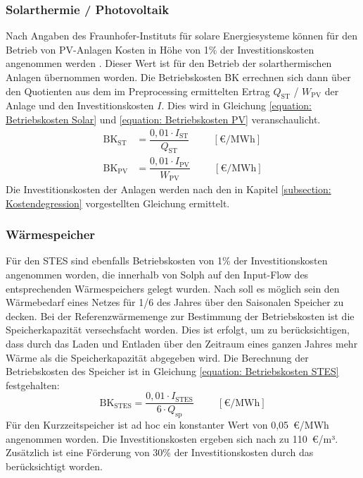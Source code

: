 \subsubsection*{Solarthermie / Photovoltaik}
Nach Angaben des Fraunhofer-Instituts für solare Energiesysteme können für den Betrieb von \ac{PV}-Anlagen Kosten in Höhe von 1\% der Investitionskosten angenommen werden \cite{ISE}. Dieser Wert ist für den Betrieb der solarthermischen Anlagen übernommen worden. Die Betriebskosten BK errechnen sich dann über den Quotienten aus dem im Preprocessing ermittelten Ertrag $Q_\text{ST}$ / $W_\text{PV}$ der Anlage und den Investitionskosten $I$. Dies wird in Gleichung \ref{equation: Betriebskosten Solar} und \ref{equation: Betriebskosten PV} veranschaulicht. 
	\begin{align}
		\label{equation: Betriebskosten Solar}
		\text{BK}_\text{ST} &= \dfrac{0,01 \cdot I_\text{ST}}{Q_\text{ST}} \hspace{1cm} [\euro/\text{MWh}]\\
		\label{equation: Betriebskosten PV}
		\text{BK}_\text{PV} &= \dfrac{0,01 \cdot I_\text{PV}}{W_\text{PV}} \hspace{1cm} [\euro/\text{MWh}]
	\end{align}
Die Investitionskosten der Anlagen werden nach den in Kapitel \ref{subsection: Kostendegression} vorgestellten Gleichung ermittelt.

\subsubsection*{Wärmespeicher}
Für den \ac{STES} sind ebenfalls Betriebskosten von 1\% der Investitionskosten angenommen worden, die innerhalb von Solph auf den Input-Flow des entsprechenden Wärmespeichers gelegt wurden. Nach \citet{Waermenetz40} soll es möglich sein den Wärmebedarf eines Netzes für 1/6 des Jahres über den Saisonalen Speicher zu decken. Bei der Referenzwärmemenge zur Bestimmung der Betriebskosten ist die Speicherkapazität versechsfacht worden. Dies ist erfolgt, um zu berücksichtigen, dass durch das Laden und Entladen über den Zeitraum eines ganzen Jahres mehr Wärme als die Speicherkapazität abgegeben wird. Die Berechnung der Betriebskosten des Speicher ist in Gleichung \ref{equation: Betriebskosten STES} festgehalten:
	\begin{equation}
		\label{equation: Betriebskosten STES}
		\text{BK}_\text{STES} = \dfrac{0,01 \cdot I_\text{STES}}{6 \cdot Q_\text{sp}} \hspace{1cm} [\euro/\text{MWh}]
	\end{equation}
Für den Kurzzeitspeicher ist ad hoc ein konstanter Wert von 0,05~\euro/MWh angenommen worden. Die Investitionskosten ergeben sich nach \citet{Waermenetz40} zu 110~\euro/m³. Zusätzlich ist eine Förderung von 30\% der Investitionskosten durch das \citet{BAFA2019} berücksichtigt worden. 

